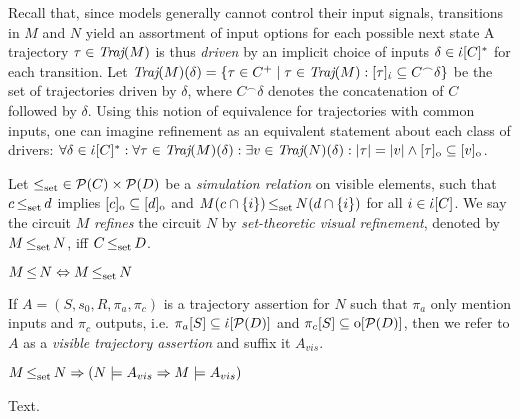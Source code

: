 Recall that, since models generally cannot control their input signals, transitions in $M$ and $N$ yield an assortment of input options for each possible next state A trajectory $\tau \in \operatorname{\textit{Traj}}(M)$ is thus \textit{driven} by an implicit choice of inputs $\delta \in \dot{\iota}[C]^{*}$ for each transition. Let $\operatorname{\textit{Traj}}(M)(\delta) = \{ \tau \in C^{+} \mid \tau \in \operatorname{\textit{Traj}}(M) : [\tau]_{\dot{\iota}} \subseteq C^{\frown}\delta \}$ be the set of trajectories driven by $\delta$, where $C^{\frown}\delta$ denotes the concatenation of $C$ followed by $\delta$. Using this notion of equivalence for trajectories with common inputs, one can imagine refinement as an equivalent statement about each class of drivers: $\forall \delta \in \dot{\iota}[C]^{*} : \forall \tau \in \operatorname{\textit{Traj}}(M)(\delta) : \exists v \in \operatorname{\textit{Traj}}(N)(\delta) : | \tau | = | v | \wedge [\tau]_{\mathrm{o}} \subseteq [v]_{\mathrm{o}}$.

 Let $\operatorname{\operatorname{\leq}_{\textrm{set}}} \in \mathcal{P}(C) \times \mathcal{P}(D)$ be a \textit{simulation relation} on visible elements, such that $c \operatorname{\operatorname{\leq}_{\textrm{set}}} d$ implies $[c]_{\mathrm{o}} \subseteq [d]_{\mathrm{o}}$ and $M(c \cap \{ i \}) \operatorname{\operatorname{\leq}_{\textrm{set}}} N(d \cap \{ i \})$ for all $i \in \dot{\iota}[C]$. We say the circuit $M$ \textit{refines} the circuit $N$ by \textit{set-theoretic visual refinement}, denoted by $M \operatorname{\operatorname{\leq}_{\textrm{set}}} N$, iff $C \operatorname{\operatorname{\leq}_{\textrm{set}}} D$. 

\begin{theorem} \label{thm:set-equals-sim}
$M \operatorname{\leq} N \Leftrightarrow M \operatorname{\operatorname{\leq}_{\textrm{set}}} N$
\end{theorem}

If $A = (S,s_{0},R,\pi_{a},\pi_{c})$ is a trajectory assertion for $N$ such that $\pi_{a}$ only mention inputs and $\pi_{c}$ outputs, i.e. $\pi_{a}[S] \subseteq \dot{\iota}[\mathcal{P}(D)]$ and $\pi_{c}[S] \subseteq \mathrm{o}[\mathcal{P}(D)]$, then we refer to $A$ as a \textit{visible trajectory assertion} and suffix it $A_{vis}$.

\begin{theorem} \label{thm:sim-refines-trans}
$M \operatorname{\operatorname{\leq}_{\textrm{set}}} N \Rightarrow (N \models A_{vis} \Rightarrow M \models A_{vis})$
\end{theorem}

Text.
